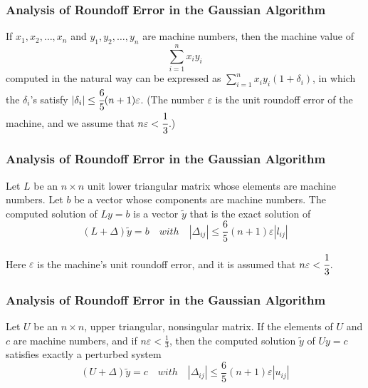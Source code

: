 \documentclass[notheorems,mathserif,table,compress]{beamer}  %
\begin{document}
%
\begin{frame}
\frametitle{Analysis of Roundoff Error in the Gaussian Algorithm}
\begin{theorem}
If $x_1,x_2,\ldots,x_n$ and $y_1,y_2,\ldots,y_n$ are machine numbers, then the machine value of 
\begin{displaymath}
\sum_{i=1}^nx_iy_i
\end{displaymath}
computed in the natural way can be expressed as $\sum_{i=1}^nx_iy_i(1+\delta _i)$, in which the $\delta_i$'s satisfy $|\delta_i|\leq\cfrac{6}{5}(n+1)\varepsilon$. (The number $\varepsilon$ is the unit roundoff error of the machine, and we assume that $n\varepsilon<\cfrac{1}{3}$.)
\end{theorem}
\end{frame}

%
\begin{frame}
\frametitle{Analysis of Roundoff Error in the Gaussian Algorithm}
\begin{theorem}
Let $L$ be an $n\times n$ unit lower triangular matrix whose elements are machine numbers. Let $b$ be a vector whose components are machine numbers. The computed solution of $Ly=b$ is a vector $\tilde{y}$ that is the exact solution of
\begin{displaymath}
(L+\Delta)\tilde{y}=b \quad with \quad |\Delta_{ij}|\leq\frac{6}{5}(n+1)\varepsilon|l_{ij}|
\end{displaymath}

Here $\varepsilon$ is the machine's unit roundoff error, and it is assumed that $n\varepsilon<\cfrac{1}{3}$.
\end{theorem}
\end{frame}

%
\begin{frame}
\frametitle{Analysis of Roundoff Error in the Gaussian Algorithm}
\begin{theorem}
Let $U$ be an $n\times n$, upper triangular, nonsingular matrix. If the elements of $U$ and $c$ are machine numbers, and if $n\varepsilon<\frac{1}{3}$, then the computed solution $\tilde{y}$ of $Uy=c$ satisfies exactly a perturbed system
\begin{displaymath}
(U+\Delta)\tilde{y}=c \quad with \quad |\Delta_{ij}|\leq\frac{6}{5}(n+1)\varepsilon|u_{ij}|
\end{displaymath}

\end{theorem}
\end{frame}
\end{document}
